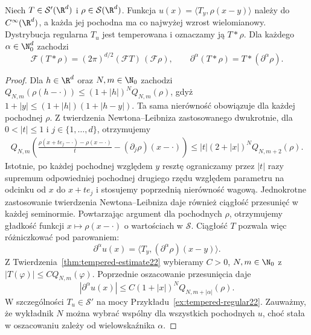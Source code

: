 \begin{twierdzenie}
\label{thm:schwartz-convolution22}
Niech $T\in\mathcal S'(\R^d)$ i
$\rho\in\mathcal S(\R^d)$. Funkcja
$u(x)=\langle T_y,\rho(x-y)\rangle$ należy do
$C^\infty(\R^d)$, a każda jej pochodna ma
co najwyżej wzrost wielomianowy. Dystrybucja
regularna $T_u$ jest temperowana i oznaczamy ją $T*\rho$.
Dla każdego $\alpha\in\N_0^d$ zachodzi
\[
\mathcal F(T*\rho)=(2\pi)^{d/2}(\mathcal FT)\,(\mathcal F\rho),
\qquad \partial^\alpha(T*\rho)=T*(\partial^\alpha\rho).
\]
\end{twierdzenie}
\begin{proof}
Dla $h\in\R^d$ oraz $N,m\in\N_0$ zachodzi
$Q_{N,m}(\rho(h-\cdot))\le(1+|h|)^N Q_{N,m}(\rho)$,
gdyż $1+|y|\le(1+|h|)(1+|h-y|)$.
Ta sama nierówność obowiązuje dla każdej pochodnej
$\rho$. Z twierdzenia Newtona--Leibniza zastosowanego
dwukrotnie, dla $0<|t|\le1$ i $j\in\{1,\ldots,d\}$,
otrzymujemy
\[
\begin{aligned}
 Q_{N,m}\left(
 \frac{\rho(x+te_j-\cdot)-\rho(x-\cdot)}{t}
 -(\partial_j\rho)(x-\cdot)\right)
 \le |t|(2+|x|)^N Q_{N,m+2}(\rho).
\end{aligned}
\]
Istotnie, po każdej pochodnej względem $y$ resztę
ograniczamy przez $|t|$ razy supremum odpowiedniej
pochodnej drugiego rzędu względem parametru na
odcinku od $x$ do $x+te_j$ i stosujemy poprzednią
nierówność wagową. Jednokrotne zastosowanie twierdzenia
Newtona--Leibniza daje również ciągłość przesunięć
w każdej seminormie. Powtarzając argument dla
pochodnych $\rho$, otrzymujemy gładkość funkcji
$x\mapsto\rho(x-\cdot)$ o wartościach w $\mathcal S$.
Ciągłość $T$ pozwala więc różniczkować pod parowaniem:
\[
 \partial^\alpha u(x)=\langle T_y,
 (\partial^\alpha\rho)(x-y)\rangle.
\]
Z Twierdzenia~\ref{thm:tempered-estimate22} wybieramy
$C>0$, $N,m\in\N_0$ z $|T(\varphi)|\le C Q_{N,m}(\varphi)$.
Poprzednie oszacowanie przesunięcia daje
\[
 |\partial^\alpha u(x)|\le
 C(1+|x|)^N Q_{N,m+|\alpha|}(\rho).
\]
W szczególności $T_u\in\mathcal S'$ na mocy
Przykładu~\ref{ex:tempered-regular22}.
Zauważmy, że wykładnik $N$ można wybrać wspólny dla
wszystkich pochodnych $u$, choć stała w oszacowaniu
zależy od wielowskaźnika $\alpha$.


\end{proof}
